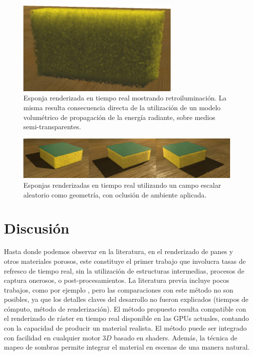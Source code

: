 \begin{figure}[htb!]
  \centerline{\includegraphics[width=8cm]{figures/fig7}}
  \caption[Esponja retroiluminada.]{Esponja renderizada en tiempo real mostrando retroiluminación. La misma resulta consecuencia directa de la utilización de un modelo volumétrico de propagación de la energía radiante, sobre medios semi-transparentes.}
  \label{fg:fig7}
\end{figure}


\begin{figure}
  \centerline{\includegraphics[width=13cm]{figures/sponges}}
  \caption{Esponjas renderizadas en tiempo real utilizando un campo escalar aleatorio como geometría, con oclusión de ambiente aplicada.}
  \label{fg:sponges}
\end{figure}

\section{Discusión}


Hasta donde podemos observar en la literatura, en el renderizado de panes y otros materiales porosos, este constituye el primer trabajo que involucra tasas de refresco de tiempo real, sin la utilización de estructuras intermedias, procesos de captura onerosos, o post-procesamientos.
La literatura previa incluye pocos trabajos, como por ejemplo \cite{Cho2007}, pero las comparaciones con este método no son posibles, ya que los detalles claves del desarrollo no fueron explicados (tiempos de cómputo, método de renderización).
El método propuesto resulta compatible con el renderizado de ráster en tiempo real disponible en las GPUs actuales, contando con la capacidad de producir un material realista.
El método puede ser integrado con facilidad en cualquier motor $3D$ basado en shaders.
Además, la técnica de mapeo de sombras permite integrar el material en escenas de una manera natural.

